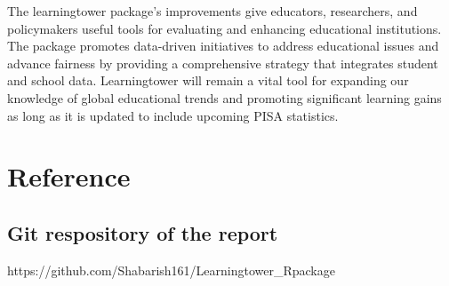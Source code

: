 \documentclass[
  11pt,
  a4paper,
]{article}
\begin{document}
The learningtower package's improvements give educators, researchers,
and policymakers useful tools for evaluating and enhancing educational
institutions. The package promotes data-driven initiatives to address
educational issues and advance fairness by providing a comprehensive
strategy that integrates student and school data. Learningtower will
remain a vital tool for expanding our knowledge of global educational
trends and promoting significant learning gains as long as it is updated
to include upcoming PISA statistics.

\section{Reference}\label{reference}

\subsection{Git respository of the
report}\label{git-respository-of-the-report}

https://github.com/Shabarish161/Learningtower\_Rpackage


\printbibliography
\end{document}
